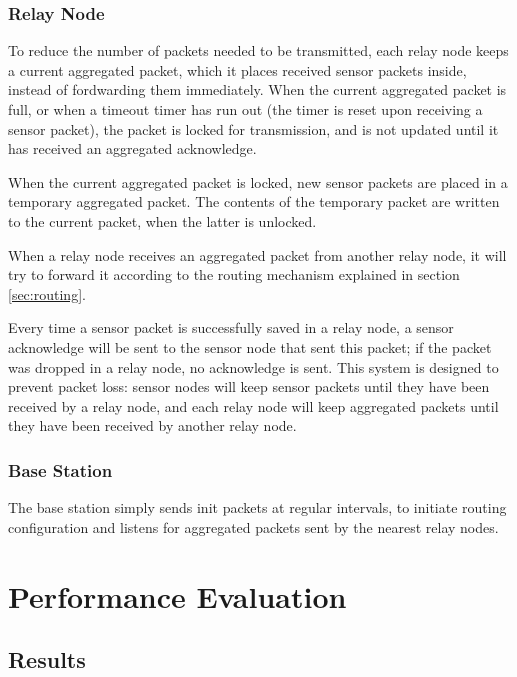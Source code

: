 \documentclass[conference]{IEEEtran}
\begin{document}
\subsubsection{Relay Node}

To reduce the number of packets needed to be transmitted, each relay node keeps
a current aggregated packet, which it places received sensor packets inside,
instead of fordwarding them immediately. When the current aggregated packet is
full, or when a timeout timer has run out (the timer is reset upon receiving
a sensor packet), the packet is locked for transmission, and is not updated
until it has received an aggregated acknowledge.

When the current aggregated packet is locked, new sensor packets are placed in
a temporary aggregated packet. The contents of the temporary packet are written
to the current packet, when the latter is unlocked.

When a relay node receives an aggregated packet from another relay node, it
will try to forward it according to the routing mechanism explained in section
\ref{sec:routing}.

Every time a sensor packet is successfully saved in a relay node, a sensor
acknowledge will be sent to the sensor node that sent this packet; if the
packet was dropped in a relay node, no acknowledge is sent. This system is
designed to prevent packet loss: sensor nodes will keep sensor packets until
they have been received by a relay node, and each relay node will keep
aggregated packets until they have been received by another relay node.

\subsubsection{Base Station}

The base station simply sends init packets at regular intervals, to initiate
routing configuration and listens for aggregated packets sent by the nearest
relay nodes. 

\section{Performance Evaluation}

\subsection{Results}
\end{document}
